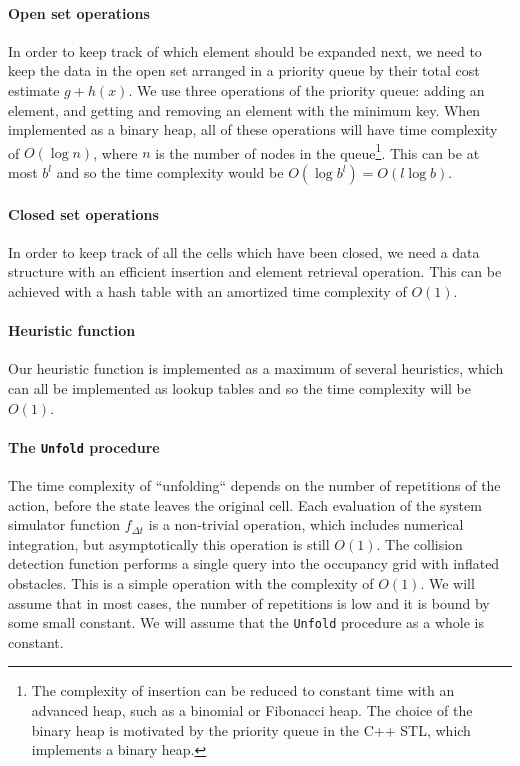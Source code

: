 \paragraph{Open set operations} In order to keep track of which element should be expanded next, we need to keep the data in the open set arranged in a priority queue by their total cost estimate $g+h(x)$. We use three operations of the priority queue: adding an element, and getting and removing an element with the minimum key. When implemented as a binary heap, all of these operations will have time complexity of $O(\log n)$, where $n$ is the number of nodes in the queue\footnote{The complexity of insertion can be reduced to constant time with an advanced heap, such as a binomial or Fibonacci heap. The choice of the binary heap is motivated by the priority queue in the C++ STL, which implements a binary heap.}. This can be at most $b^l$ and so the time complexity would be $O(\log b^l)=O(l \log b)$.

\paragraph{Closed set operations} In order to keep track of all the cells which have been closed, we need a data structure with an efficient insertion and element retrieval operation. This can be achieved with a hash table with an amortized time complexity of $O(1)$.

\paragraph{Heuristic function} Our heuristic function is implemented as a maximum of several heuristics, which can all be implemented as lookup tables and so the time complexity will be $O(1)$.

\paragraph{The \texttt{Unfold} procedure}
The time complexity of ``unfolding`` depends on the number of repetitions of the action, before the state leaves the original cell. Each evaluation of the system simulator function $f_{\Delta t}$ is a non-trivial operation, which includes numerical integration, but asymptotically this operation is still $O(1)$. The collision detection function performs a single query into the occupancy grid with inflated obstacles. This is a simple operation with the complexity of $O(1)$. We will assume that in most cases, the number of repetitions is low and it is bound by some small constant. We will assume that the \texttt{Unfold} procedure as a whole is constant.

